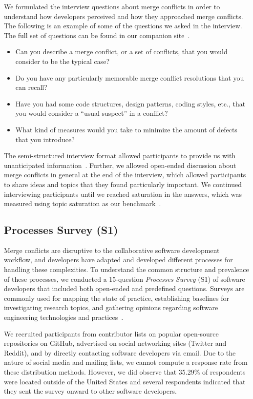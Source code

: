 We formulated the interview questions about merge conflicts in order to understand how developers perceived and how they approached merge conflicts.
The following is an example of some of the questions we asked in the interview.
The full set of questions can be found in our companion site~\cite{companion_site}.
\begin{itemize}
	\item Can you describe a merge conflict, or a set of conflicts, that you would consider to be the typical case?
	\item Do you have any particularly memorable merge conflict resolutions that you can recall?
	\item Have you had some code structures, design patterns, coding styles, etc., that you would consider a ``usual suspect'' in a conflict?
	\item What kind of measures would you take to minimize the amount of defects that you introduce?
\end{itemize}

The semi-structured interview format allowed participants to provide us with unanticipated information~\cite{seaman2008qualitative}. 
Further, we allowed open-ended discussion about merge conflicts in general at the end of the interview, which allowed participants to share ideas and topics that they found particularly important. 
We continued interviewing participants until we reached saturation in the answers, which was measured using topic saturation as our benchmark~\cite{fusch2015we}.

\subsection{Processes Survey (S1)}\label{processes_survey}

Merge conflicts are disruptive to the collaborative software development workflow, and developers have adapted and developed different processes for handling these complexities.
To understand the common structure and prevalence of these processes, we conducted a 15-question \textit{Processes Survey} (S1) of software developers that included both open-ended and predefined questions.
Surveys are commonly used for mapping the state of practice, establishing baselines for investigating research topics, and gathering opinions regarding software engineering technologies and practices~\cite{deMello2016survey}.

We recruited participants from contributor lists on popular open-source repositories on GitHub, advertised on social networking sites (Twitter and Reddit), and by directly contacting software developers via email.
Due to the nature of social media and mailing lists, we cannot compute a response rate from these distribution methods.
However, we did observe that 35.29\% of respondents were located outside of the United States and several respondents indicated that they sent the survey onward to other software developers.

